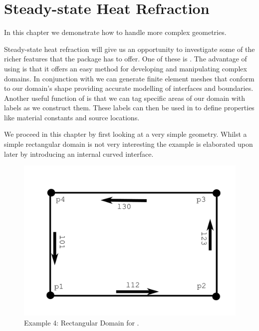 
%
%
%

\section{Steady-state Heat Refraction}
\label{STEADY-STATE HEAT REFRACTION}

In this chapter we demonstrate how to handle more complex geometries. 

Steady-state heat refraction will give us an opportunity to investigate some of
the richer features that the \esc package has to offer. One of these is \pycad .
The advantage of using \pycad is that it offers an easy method for developing
and manipulating complex domains. In conjunction with \gmsh we can generate
finite element meshes that conform to our domain's shape providing accurate
modelling of interfaces and boundaries. Another useful function of \pycad is
that we can tag specific areas of our domain with labels as we construct them.
These labels can then be used in \esc to define properties like material
constants and source locations. 

We proceed in this chapter by first looking at a very simple geometry. Whilst a
simple rectangular domain is not very interesting the example is elaborated upon
later by introducing an internal curved interface.

\begin{figure}[ht]
\centerline{\includegraphics[width=4.in]{figures/pycadrec}}
\caption{Example 4: Rectangular Domain for \pycad.}
\label{fig:pycad rec}
\end{figure}

